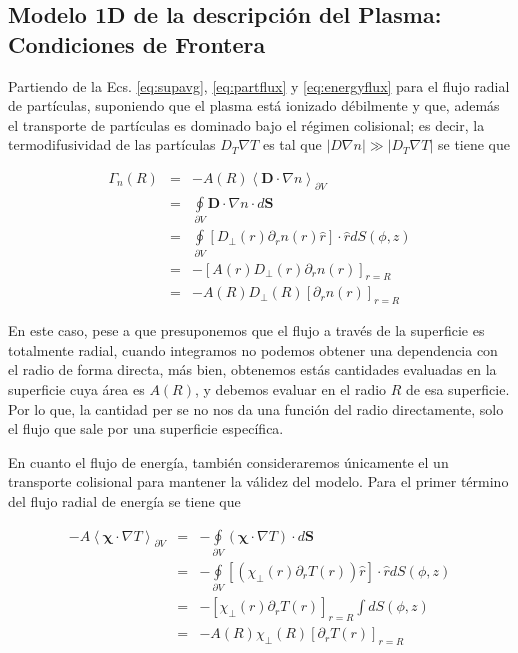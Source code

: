 \subsection{Modelo 1D de la descripci\'on del Plasma: Condiciones de Frontera}

Partiendo de la Ecs. \eqref{eq:supavg}, \eqref{eq:partflux} y \eqref{eq:energyflux} para el flujo radial de part\'iculas, suponiendo que el plasma est\'a ionizado d\'ebilmente y que, adem\'as el transporte de part\'iculas es dominado bajo el r\'egimen colisional; es decir, la termodifusividad de las part\'iculas $D_T\nabla T$ es tal que $|D\nabla n| \gg |D_T\nabla T|$ se tiene que

\begin{eqnarray}
  \Gamma_n(R) &=& -A(R)\left<\textbf{D}\cdot\nabla n\right>_{\partial V} \\
           &=& \oint\limits_{\partial V} \textbf{D}\cdot\nabla n\cdot d\textbf{S}\\
           &=& \oint\limits_{\partial V} [D_\perp(r)\partial_r n(r)\hat{r}]\cdot\hat{r}dS(\phi,z) \\
           &=& -[A(r)D_\perp(r)\partial_r n(r)]_{r=R}\\
           &=& -A(R)D_\perp(R)[\partial_r n(r)]_{r=R}
\end{eqnarray}

En este caso, pese a que presuponemos que el flujo a trav\'es de la superficie es totalmente radial, cuando integramos no podemos obtener una dependencia con el radio de forma directa, m\'as bien, obtenemos est\'as cantidades evaluadas en la superficie cuya \'area es $A(R)$, y debemos evaluar en el radio $R$ de esa superficie. Por lo que, la cantidad per se no nos da una funci\'on del radio directamente, solo el flujo que sale por una superficie espec\'ifica. 

En cuanto el flujo de energ\'ia, tambi\'en consideraremos \'unicamente el un transporte colisional para mantener la v\'alidez del modelo. Para el primer t\'ermino del flujo radial de energ\'ia se tiene que 

\begin{eqnarray}
  -A\left<\pmb{\chi}\cdot\nabla T\right>_{\partial V} &=& - \oint\limits_{\partial V} (\pmb{\chi}\cdot\nabla T)\cdot d\textbf{S} \\
                                                      &=& -\oint\limits_{\partial V} [(\chi_\perp(r) \partial_r T(r))\hat{r}]\cdot\hat{r}dS(\phi,z)\\
                                                      &=& -[\chi_\perp(r)\partial_rT(r)]_{r=R}\int dS(\phi,z)\\
                                                      &=& -A(R)\chi_\perp(R)[\partial_rT(r)]_{r=R}
\end{eqnarray}

